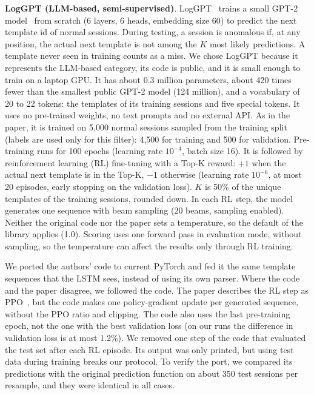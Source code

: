 \documentclass[10pt, conference]{IEEEtran}
\renewcommand{\paragraph}[1]{\noindent\textbf{#1}.}
\begin{document}
\paragraph{LogGPT (LLM-based, semi-supervised)} LogGPT~\cite{han2023loggpt} trains a small GPT-2 model~\cite{radford2019gpt2} from scratch (6 layers, 6 heads, embedding size 60) to predict the next template id of normal sessions. During testing, a session is anomalous if, at any position, the actual next template is not among the $K$ most likely predictions. A template never seen in training counts as a miss. We chose LogGPT because it represents the LLM-based category, its code is public, and it is small enough to train on a laptop GPU. It has about 0.3 million parameters, about 420 times fewer than the smallest public GPT-2 model (124 million), and a vocabulary of 20 to 22 tokens: the templates of its training sessions and five special tokens. It uses no pre-trained weights, no text prompts and no external API. As in the paper, it is trained on 5,000 normal sessions sampled from the training split (labels are used only for this filter): 4,500 for training and 500 for validation. Pre-training runs for 100 epochs (learning rate $10^{-4}$, batch size 16). It is followed by reinforcement learning (RL) fine-tuning with a Top-K reward: $+1$ when the actual next template is in the Top-K, $-1$ otherwise (learning rate $10^{-6}$, at most 20 episodes, early stopping on the validation loss). $K$ is 50\% of the unique templates of the training sessions, rounded down. In each RL step, the model generates one sequence with beam sampling (20 beams, sampling enabled). Neither the original code nor the paper sets a temperature, so the default of the library applies (1.0). Scoring uses one forward pass in evaluation mode, without sampling, so the temperature can affect the results only through RL training.

We ported the authors' code to current PyTorch and fed it the same template sequences that the LSTM sees, instead of using its own parser. Where the code and the paper disagree, we followed the code. The paper describes the RL step as PPO~\cite{schulman2017ppo}, but the code makes one policy-gradient update per generated sequence, without the PPO ratio and clipping. The code also uses the last pre-training epoch, not the one with the best validation loss (on our runs the difference in validation loss is at most 1.2\%). We removed one step of the code that evaluated the test set after each RL episode. Its output was only printed, but using test data during training breaks our protocol. To verify the port, we compared its predictions with the original prediction function on about 350 test sessions per resample, and they were identical in all cases.
\end{document}
